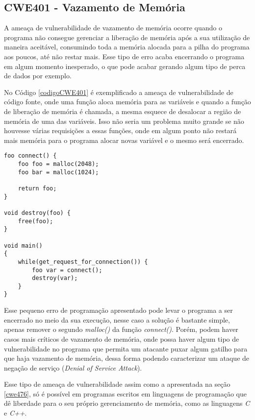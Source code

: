 \subsection{CWE401 - Vazamento de Memória}\label{cwe401}

A ameaça de vulnerabilidade de vazamento de memória ocorre quando o programa não
consegue gerenciar a liberação de memória após a sua utilização de maneira
aceitável, consumindo toda a memória alocada para a pilha do programa aos
poucos, até não restar mais. Esse tipo de erro acaba encerrando o programa em
algum momento inesperado, o que pode acabar gerando algum tipo de perca de dados
por exemplo.

No Código \ref{codigoCWE401} é exemplificado a ameaça de vulnerabilidade de
código fonte, onde uma função aloca memória para as variáveis e quando a função
de liberação de memória é chamada, a mesma esquece de desalocar a região de
memória de uma das variáveis. Isso não seria um problema muito grande se não
houvesse várias requisições a essas funções, onde em algum ponto não restará
mais memória para o programa alocar novas variável e o mesmo será encerrado.

\begin{lstlisting}[caption={Código exemplo CWE401}, label=codigoCWE401]
foo connect() {
    foo foo = malloc(2048);
    foo bar = malloc(1024);

    return foo;
}

void destroy(foo) {
    free(foo);
}

void main()
{
    while(get_request_for_connection()) {
        foo var = connect();
        destroy(var);
    }
}
\end{lstlisting}

Esse pequeno erro de programação apresentado pode levar o programa a ser
encerrado no meio da sua execução, nesse caso a solução é bastante simple,
apenas remover o segundo \textit{malloc()} da função \textit{connect()}. Porém,
podem haver casos mais críticos de vazamento de memória, onde possa haver algum
tipo de vulnerabilidade no programa que permita um atacante puxar algum gatilho
para que haja vazamento de memória, dessa forma podendo caracterizar um ataque
de negação de serviço (\textit{Denial of Service Attack}).

Esse tipo de ameaça de vulnerabilidade assim como a apresentada na seção
\ref{cwe476}, só é possível em programas escritos em linguagens de programação
que dê liberdade para o seu próprio gerenciamento de memória, como as linguagens
\textit{C} e \textit{C++}.
